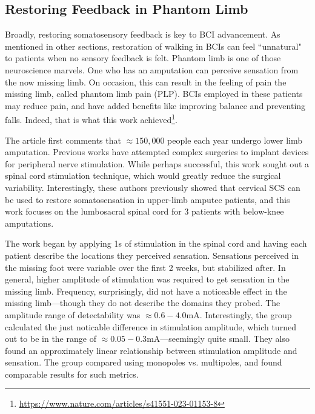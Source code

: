 \subsection{Restoring Feedback in Phantom Limb}

Broadly, restoring somatosensory feedback is key to BCI advancement. As mentioned in other sections, restoration of walking in BCIs can feel ``unnatural" to patients when no sensory feedback is felt. Phantom limb is one of those neuroscience marvels. One who has an amputation can perceive sensation from the now missing limb. On occasion, this can result in the feeling of pain the missing limb, called phantom limb pain (PLP). BCIs employed in these patients may reduce pain, and have added benefits like improving balance and preventing falls. Indeed, that is what this work achieved\footnote{\url{https://www.nature.com/articles/s41551-023-01153-8}}.\newline

The article first comments that $\approx 150,000$ people each year undergo lower limb amputation. Previous works have attempted complex surgeries to implant devices for peripheral nerve stimulation. While perhaps successful, this work sought out a spinal cord stimulation technique, which would greatly reduce the surgical variability. Interestingly, these authors previously showed that cervical SCS can be used to restore somatosensation in upper-limb amputee patients, and this work focuses on the lumbosacral spinal cord for 3 patients with below-knee amputations.\newline

The work began by applying 1s of stimulation in the spinal cord and having each patient describe the locations they perceived sensation. Sensations perceived in the missing foot were variable over the first 2 weeks, but stabilized after. In general, higher amplitude of stimulation was required to get sensation in the missing limb. Frequency, surprisingly, did not have a noticeable effect in the missing limb---though they do not describe the domains they probed. The amplitude range of detectability was $\approx 0.6 - 4.0$mA. Interestingly, the group calculated the just noticable difference in stimulation amplitude, which turned out to be in the range of $\approx 0.05 - 0.3$mA---seemingly quite small. They also found an approximately linear relationship between stimulation amplitude and sensation. The group compared using monopoles vs. multipoles, and found comparable results for such metrics.\newline


